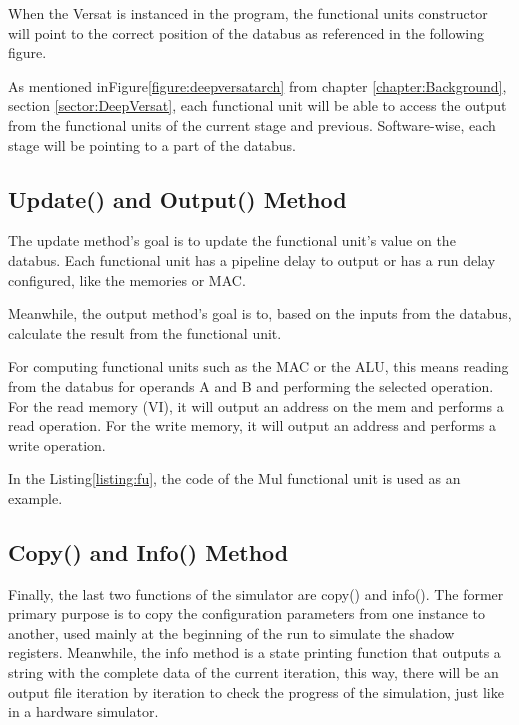 When the Versat is instanced in the program, the functional units constructor will point
to the correct position of the databus as referenced in the following figure.

As mentioned inFigure\ref{figure:deepversatarch} from chapter \ref{chapter:Background}, section \ref{sector:DeepVersat}, 
each functional unit will be able to access the output from the functional units of the
current stage and previous. Software-wise, each stage will be pointing to a part of the databus.  



\subsection{Update() and Output() Method}


The update method's goal is to update the functional unit's value on the databus. 
Each functional unit has a pipeline delay to output or has a run delay configured, 
like the memories or MAC.

Meanwhile, the output method's goal is to, based on the inputs from the databus, calculate the result from
 the functional unit.

 For computing functional units such as the MAC or the ALU, this means reading from the databus for operands A and B
 and performing the selected operation. For the read memory (VI), it will output an address on the mem
 and performs a read operation. For the write memory, it will output an address and performs a write operation.

 In the Listing\ref{listing:fu}, the code of the Mul functional unit is used as an example.

 \newpage
 


\subsection{Copy() and Info() Method}

Finally, the last two functions of the simulator are copy() and info(). The former primary purpose is to copy the configuration parameters from one instance to another,
used mainly at the beginning of the run to simulate the shadow registers.
Meanwhile, the info method is a state printing function that outputs a string with the complete data of the current iteration,
this way, there will be an output file iteration by iteration to check the progress of the simulation, just like in a hardware simulator.


